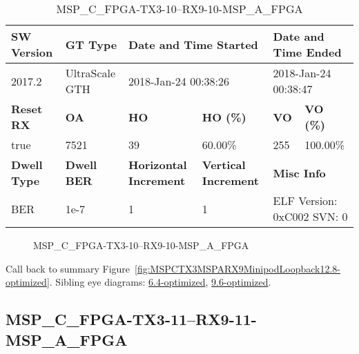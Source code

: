 \begin{table}[h]
\centering
\caption{MSP\_C\_FPGA-TX3-10--RX9-10-MSP\_A\_FPGA}
\label{tab:MSPCFPGATX310RX910MSPAFPGA12.8-optimized}
\begin{tabular}{@{}|l|l|l|l|l|l|@{}}
\toprule
\textbf{SW Version}                & \textbf{GT Type}   & \multicolumn{2}{l|}{\textbf{Date and Time Started}}            & \multicolumn{2}{l|}{\textbf{Date and Time Ended}}        \\ \midrule
2017.2                       & UltraScale GTH          & \multicolumn{2}{l|}{2018-Jan-24 00:38:26}                   & \multicolumn{2}{l|}{2018-Jan-24 00:38:47}               \\ \midrule
\textbf{Reset RX}                  & \textbf{OA} & \textbf{HO}   & \textbf{HO (\%)} & \textbf{VO} & \textbf{VO (\%)} \\ \midrule
true & 7521        & 39          & 60.00\%        & 255        & 100.00\%       \\ \midrule
\textbf{Dwell Type}                & \textbf{Dwell BER} & \textbf{Horizontal Increment} & \textbf{Vertical Increment}    & \multicolumn{2}{l|}{\textbf{Misc Info}}                  \\ \midrule
BER                            & 1e-7        & 1        & 1           & \multicolumn{2}{l|}{ELF Version: 0xC002 SVN: 0}                         \\ \bottomrule
\end{tabular}
\end{table}

\begin{figure}[h]
\caption{MSP\_C\_FPGA-TX3-10--RX9-10-MSP\_A\_FPGA} \label{fig:MSPCFPGATX310RX910MSPAFPGA12.8-optimized}
\end{figure}

Call back to summary Figure~\ref{fig:MSPCTX3MSPARX9MinipodLoopback12.8-optimized}.
Sibling eye diagrams: \hyperref[sec:MSPCFPGATX310RX910MSPAFPGA6.4-optimized]{6.4-optimized}, \hyperref[sec:MSPCFPGATX310RX910MSPAFPGA9.6-optimized]{9.6-optimized}.

\clearpage
\newpage


\subsection{MSP\_C\_FPGA-TX3-11--RX9-11-MSP\_A\_FPGA}\label{sec:MSPCFPGATX311RX911MSPAFPGA12.8-optimized}

